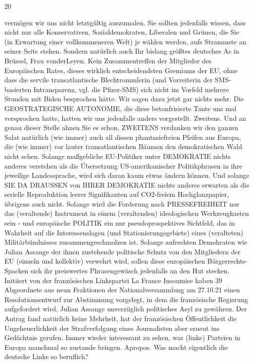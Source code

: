 \begin{multicols}{2}
20

vermögen wir uns nicht letztgültig auszumalen. Sie
sollten jedenfalls wissen, dass nicht nur alle Konservativen, Sozialdemokraten, Liberalen und Grünen, die Sie
(in Erwartung einer vollkommeneren Welt) je wählen
werden, aufs Strammste an seiner Seite stehen. Sondern natürlich auch Ihr bislang größtes deutsches As in
Brüssel, Frau vonderLeyen. Kein Zusammentreffen der
Mitglieder des Europäischen Rates, dieses wirklich entscheidendsten Gremiums der EU, ohne dass die servile
transatlantische Blechtrommlerin (und Vorreiterin der
SMS-basierten Intransparenz, vgl. die Pfizer-SMS) sich
nicht im Vorfeld mehrere Stunden mit Biden besprochen
hätte. Wir sagen dazu jetzt gar nichts mehr. Die GEOSTRATEGISCHE AUTONOMIE, die diese betonfrisierte
Tante uns mal versprochen hatte, hatten wir uns jedenfalls anders vorgestellt.
Zweitens.
Und an genau dieser Stelle ahnen Sie es schon. ZWEITENS verdanken wir den ganzen Salat natürlich (wie
immer) auch all diesen phantasiefreien Pfeifen aus Europa, die (wie immer) vor lauter transatlantischen Bäumen den demokratischen Wald nicht sehen. Solange
maßgebliche EU-Politiker unter DEMOKRATIE nichts
anderes verstehen als die Übersetzung US-amerikanischer Politikphrasen in ihre jeweilige Landessprache,
wird sich daran kaum etwas ändern können. Und solange SIE DA DRAUSSEN von IHRER DEMOKRATIE nichts
anderes erwarten als die serielle Reproduktion leerer Signifikanten auf CO2-freiem Hochglanzpapier, übrigens
auch nicht. Solange wird die Forderung nach PRESSEFREIHEIT nur das (veraltende) Instrument in einem
(veraltenden) ideologischen Werkzeugkasten sein - und
europäische POLITIK ein nur pseudoprospektives Sichtfeld, das in Wahrheit auf die Interessenslagen (und Stationierungsgebiete) eines (veralteten) Militärbündnisses
zusammengeschmolzen ist.
Solange aufrechten Demokraten wie Julian Assange der
ihnen zustehende politische Schutz von den Mitgliedern
der EU (einzeln und kollektiv) verwehrt wird, sollen diese europäischen Bürgerrechts-Spacken sich ihr preiswertes Phrasengewäsch jedenfalls an den Hut stecken.
Initiiert von der französischen Linkspartei La France Insoumise haben 39 Abgeordnete aus neun Fraktionen der
Nationalversammlung am 27.10.21 einen Resolutionsentwurf zur Abstimmung vorgelegt, in dem die französische Regierung aufgefordert wird, Julian Assange unverzüglich politisches Asyl zu gewähren. Der Antrag fand
natürlich keine Mehrheit, hat der französischen Öffentlichkeit die Ungeheuerlichkeit der Strafverfolgung eines
Journalisten aber erneut ins Gedächtnis gerufen.
Immer wieder interessant zu sehen, was (linke) Parteien
in Europa manchmal so zustande bringen. Apropos. Was
macht eigentlich die deutsche Linke so beruflich?


\end{multicols}
